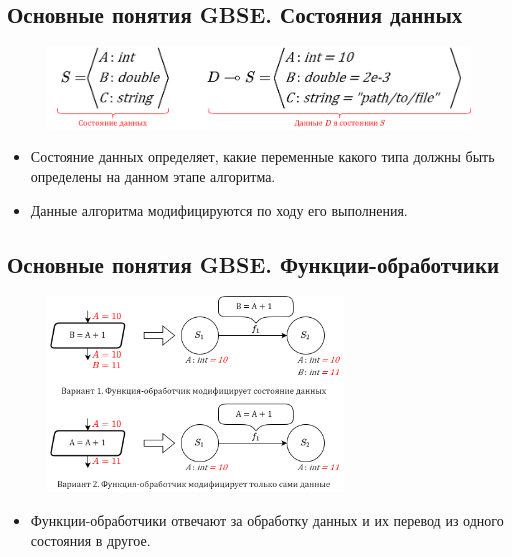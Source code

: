 ﻿%
\subsection{Основные понятия GBSE. Состояния данных}
\begin{frame}
	\begin{figure}
		\centering
		\includegraphics[width=\textwidth]{images/illustration.datastate.png}
	\end{figure}

	\begin{itemize}
		\item Состояние данных определяет, какие переменные какого типа должны быть определены на данном этапе алгоритма.
		\item Данные алгоритма модифицируются по ходу его выполнения.
	\end{itemize}
\end{frame}

\subsection{Основные понятия GBSE. Функции-обработчики}
\begin{frame}
	\begin{figure}
		\centering
		\includegraphics[width=0.7\textwidth]{images/illustration.transfer.png}
	\end{figure}

	\begin{itemize}
		\item Функции-обработчики отвечают за обработку данных и их перевод из одного состояния в другое.
	\end{itemize}

\end{frame}


